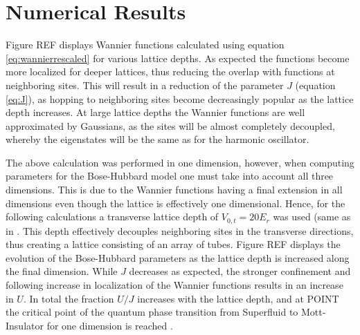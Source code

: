 \chapter{Numerical Results}

Figure REF displays Wannier functions calculated using equation \ref{eq:wannierrescaled} for various lattice depths. As expected the functions become more localized for deeper lattices, thus reducing the overlap with functions at neighboring sites. This will result in a reduction of the parameter $J$ (equation \ref{eq:J}), as hopping to neighboring sites become decreasingly popular as the lattice depth increases. At large lattice depths the Wannier functions are well approximated by Gaussians, as the sites will be almost completely decoupled, whereby the eigenstates will be the same as for the harmonic oscillator. 

The above calculation was performed in one dimension, however, when computing parameters for the Bose-Hubbard model one must take into account all three dimensions. This is due to the Wannier functions having a final extension in all dimensions even though the lattice is effectively one dimensional. Hence, for the following calculations a transverse lattice depth of $V_{0,t} = 20 E_r$ was used (same as in \cite{FrankBloch}. This depth effectively decouples neighboring sites in the transverse directions, thus creating a lattice consisting of an array of tubes.
Figure REF displays the evolution of the Bose-Hubbard parameters as the lattice depth is increased along the final dimension. While $J$ decreases as expected, the stronger confinement and following increase in localization of the Wannier functions results in an increase in $U$. In total the fraction $U/J$ increases with the lattice depth, and at POINT the critical point of the quantum phase transition from Superfluid to Mott-Insulator for one dimension is reached \cite{Kuhner2000}. 